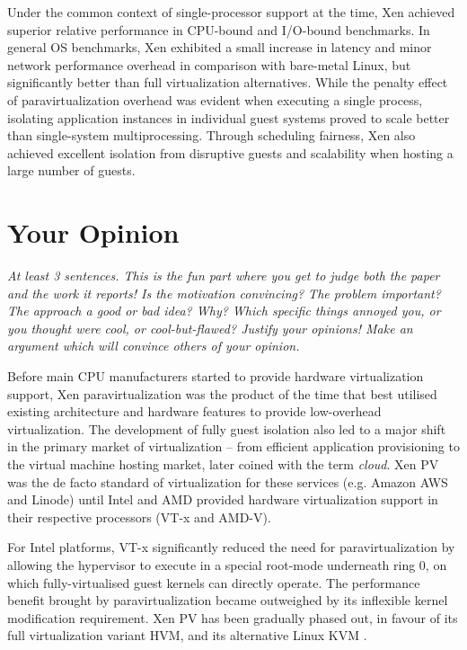 \documentclass[11pt]{article}
\begin{document}
Under the common context of single-processor support at the time, Xen achieved superior relative performance in CPU-bound and I/O-bound benchmarks. In general OS benchmarks, Xen exhibited a small increase in latency and minor network performance overhead in comparison with bare-metal Linux, but significantly better than full virtualization alternatives. While the penalty effect of paravirtualization overhead was evident when executing a single process, isolating application instances in individual guest systems proved to scale better than single-system multiprocessing. Through scheduling fairness, Xen also achieved excellent isolation from disruptive guests and scalability when hosting a large number of guests. 

\section*{Your Opinion}
\textsl{At least 3 sentences. This is the fun part where you get to judge both the paper and the work it reports! Is the motivation convincing? The problem important? The approach a good or bad idea?  Why? Which specific things annoyed you, or you thought were cool, or cool-but-flawed? Justify your opinions! Make an argument which will convince others of your opinion.}

Before main CPU manufacturers started to provide hardware virtualization support, Xen paravirtualization was the product of the time that best utilised existing architecture and hardware features to provide low-overhead virtualization. The development of fully guest isolation also led to a major shift in the primary market of virtualization -- from efficient application provisioning to the virtual machine hosting market, later coined with the term \emph{cloud}. Xen PV was the de facto standard of virtualization for these services (e.g. Amazon AWS and Linode) until Intel and AMD provided hardware virtualization support in their respective processors (VT-x \cite{uhlig2005intel} and AMD-V). 

For Intel platforms, VT-x significantly reduced the need for paravirtualization by allowing the hypervisor to execute in a special root-mode underneath ring 0, on which fully-virtualised guest kernels can directly operate. The performance benefit brought by paravirtualization became outweighed by its inflexible kernel modification requirement. Xen PV has been gradually phased out, in favour of its full virtualization variant HVM, and its alternative Linux KVM \cite{graziano2011performance}.
\end{document}

